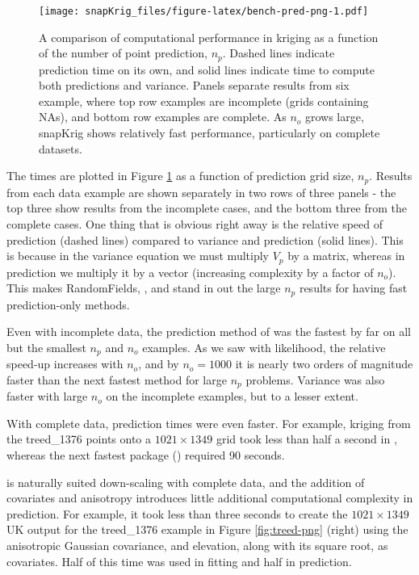 \begin{figure}
\centering
\texttt{[image: snapKrig\_files/figure-latex/bench-pred-png-1.pdf]}
\caption{\label{fig:bench-pred-png}A comparison of computational performance in kriging as a function of the number of point prediction, \(n_p\). Dashed lines indicate prediction time on its own, and solid lines indicate time to compute both predictions and variance. Panels separate results from six example, where top row examples are incomplete (grids containing NAs), and bottom row examples are complete. As \(n_o\) grows large, snapKrig shows relatively fast performance, particularly on complete datasets.}
\end{figure}

The times are plotted in Figure \ref{fig:bench-pred-png} as a function of prediction grid size, \(n_p\). Results from each data example are shown separately in two rows of three panels - the top three show results from the incomplete cases, and the bottom three from the complete cases. One thing that is obvious right away is the relative speed of prediction (dashed lines) compared to variance and prediction (solid lines). This is because in the variance equation we must multiply \(V_p\) by a matrix, whereas in prediction we multiply it by a vector (increasing complexity by a factor of \(n_o\)). This makes RandomFields, , and  stand in out the large \(n_p\) results for having fast prediction-only methods.

Even with incomplete data, the prediction method of  was the fastest by far on all but the smallest \(n_p\) and \(n_o\) examples. As we saw with likelihood, the relative speed-up increases with \(n_o\), and by \(n_o=1000\) it is nearly two orders of magnitude faster than the next fastest method for large \(n_p\) problems. Variance was also faster with large \(n_o\) on the incomplete examples, but to a lesser extent.

With complete data, prediction times were even faster. For example, kriging from the treed\_1376 points onto a \(1021 \times 1349\) grid took less than half a second in , whereas the next fastest package () required 90 seconds.

 is naturally suited down-scaling with complete data, and the addition of covariates and anisotropy introduces little additional computational complexity in prediction. For example, it took less than three seconds to create the \(1021 \times 1349\) UK output for the treed\_1376 example in Figure \ref{fig:treed-png} (right) using the anisotropic Gaussian covariance, and elevation, along with its square root, as covariates. Half of this time was used in fitting and half in prediction.

